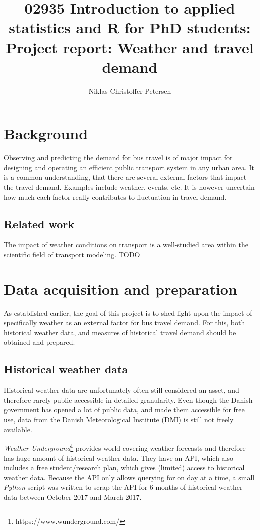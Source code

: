 \documentclass[a4paper,11pt]{article}
\title{{\small 02935 Introduction to applied statistics and R for PhD students: }\\[1em]Project report: Weather and travel demand}
\author{Niklas Christoffer Petersen}
\affil{Transport Modelling, Department of Management Engineering \\ Technical University of Denmark, 2800 Kongens Lyngby, Denmark}
\begin{document}
\singlespace
\maketitle
\thispagestyle{empty}
\clearpage

\onehalfspacing
{}
\tableofcontents
\clearpage

\section{Background}\label{ch:background}

Observing and predicting the demand for bus travel is of major impact for designing and operating an efficient public transport system in any urban area. It is a common understanding, that there are several external factors that impact the travel demand. Examples include weather, events, etc. It is however uncertain how much each factor really contributes to fluctuation in travel demand. 

\subsection{Related work}\label{ch:relatedWork}
The impact of weather conditions on transport is a well-studied area within the scientific field of transport modeling.
TODO
\clearpage

\section{Data acquisition and preparation}\label{ch:data}
As established earlier, the goal of this project is to shed light upon the impact of specifically weather as an external factor for bus travel demand. For this, both historical weather data, and measures of historical travel demand should be obtained and prepared.

\subsection{Historical weather data}\label{ch:data_weather}
Historical weather data are unfortunately often still considered an asset, and therefore rarely public accessible in detailed granularity. Even though the Danish government has opened a lot of public data, and made them accessible for free use, data from the Danish Meteorological Institute (DMI) is still not freely available.

\emph{Weather Underground}\footnote{https://www.wunderground.com/} provides world covering weather forecasts and therefore has huge amount of historical weather data. They have an API, which also includes a free student/research plan, which gives (limited) access to historical weather data. Because the API only allows querying for on day at a time, a small \emph{Python} script was written to scrap the API for 6 months of historical weather data between October 2017 and March 2017.
\end{document}
